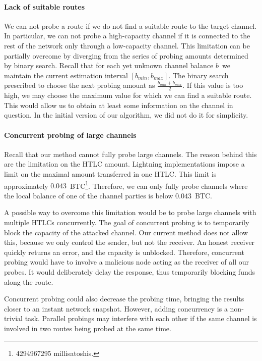 \paragraph{Lack of suitable routes}

We can not probe a route if we do not find a suitable route to the target channel.
In particular, we can not probe a high-capacity channel if it is connected to the rest of the network only through a low-capacity channel.
This limitation can be partially overcome by diverging from the series of probing amounts determined by binary search.
Recall that for each yet unknown channel balance $b$~we maintain the current estimation interval $[b_{min}, b_{max}]$.
The binary search prescribed to choose the next probing amount as $\frac{b_{min} + b_{max}}{2}$.
If this value is too high, we may choose the maximum value for which we can find a suitable route.
This would allow us to obtain at least some information on the channel in question.
In the initial version of our algorithm, we did not do it for simplicity.

\paragraph{Concurrent probing of large channels}

Recall that our method cannot fully probe large channels.
The reason behind this are the limitation on the HTLC amount.
Lightning implementations impose a limit on the maximal amount transferred in one HTLC\@.
This limit is approximately $0.043$~BTC\footnote{4294967295 millisatoshis.}.
Therefore, we can only fully probe channels where the local balance of one of the channel parties is below $0.043$~BTC\@.

A possible way to overcome this limitation would be to probe large channels with multiple HTLCs concurrently.
The goal of concurrent probing is to temporarily block the capacity of the attacked channel.
Our current method does not allow this, because we only control the sender, but not the receiver.
An honest receiver quickly returns an error, and the capacity is unblocked.
Therefore, concurrent probing would have to involve a malicious node acting as the receiver of all our probes.
It would deliberately delay the response, thus temporarily blocking funds along the route.

Concurrent probing could also decrease the probing time, bringing the results closer to an instant network snapshot.
However, adding concurrency is a non-trivial task.
Parallel probings may interfere with each other if the same channel is involved in two routes being probed at the same time.

